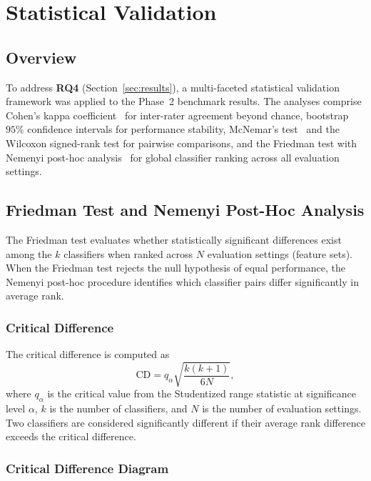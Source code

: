 \section{Statistical Validation}
\label{sec:statistics}

\subsection{Overview}

To address \textbf{RQ4} (Section~\ref{sec:results}), a multi-faceted statistical
validation framework was applied to the Phase~2 benchmark results. The analyses
comprise Cohen's kappa coefficient~\cite{cohen1960} for inter-rater agreement
beyond chance, bootstrap $95\%$ confidence intervals for performance stability,
McNemar's test~\cite{mcnemar1947} and the Wilcoxon signed-rank test for pairwise
comparisons, and the Friedman test with Nemenyi post-hoc analysis~\cite{demsar2006}
for global classifier ranking across all evaluation settings.

\subsection{Friedman Test and Nemenyi Post-Hoc Analysis}

The Friedman test evaluates whether statistically significant differences exist
among the $k$ classifiers when ranked across $N$ evaluation settings (feature
sets). When the Friedman test rejects the null hypothesis of equal performance,
the Nemenyi post-hoc procedure identifies which classifier pairs differ
significantly in average rank.

\subsubsection{Critical Difference}

The critical difference is computed as
\begin{equation}
\mathrm{CD} = q_{\alpha}\sqrt{\frac{k(k+1)}{6N}},
\label{eq:nemenyi_cd}
\end{equation}
where $q_{\alpha}$ is the critical value from the Studentized range statistic at
significance level $\alpha$, $k$ is the number of classifiers, and $N$ is the
number of evaluation settings. Two classifiers are considered significantly
different if their average rank difference exceeds the critical difference.

\subsubsection{Critical Difference Diagram}

